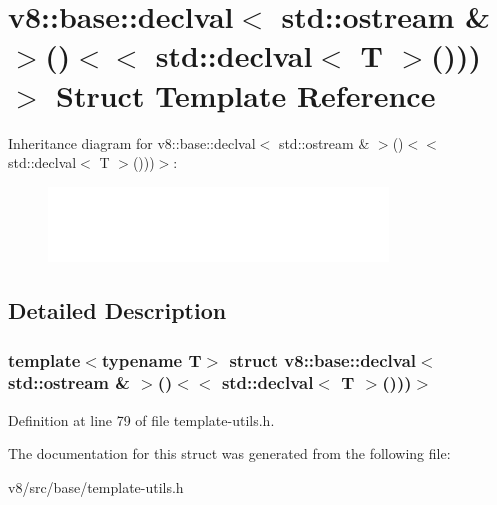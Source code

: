 \hypertarget{structv8_1_1base_1_1has__output__operator_3_01T_00_01decltype_07void_07std_1_1declval_3_01std_1_e71c171d5446bd2be4ce9ee2faa3c0bc}{}\section{v8\+:\+:base\+:\+:declval$<$ std\+:\+:ostream \& $>$()$<$$<$ std\+:\+:declval$<$ T $>$()))$>$ Struct Template Reference}
\label{structv8_1_1base_1_1has__output__operator_3_01T_00_01decltype_07void_07std_1_1declval_3_01std_1_e71c171d5446bd2be4ce9ee2faa3c0bc}
Inheritance diagram for v8\+:\+:base\+:\+:declval$<$ std\+:\+:ostream \& $>$()$<$$<$ std\+:\+:declval$<$ T $>$()))$>$\+:\begin{figure}[H]
\begin{center}
\leavevmode
\includegraphics[height=2.000000cm]{structv8_1_1base_1_1has__output__operator_3_01T_00_01decltype_07void_07std_1_1declval_3_01std_1_e71c171d5446bd2be4ce9ee2faa3c0bc}
\end{center}
\end{figure}


\subsection{Detailed Description}
\subsubsection*{template$<$typename T$>$\newline
struct v8\+::base\+::declval$<$ std\+::ostream \& $>$()$<$$<$ std\+::declval$<$ T $>$()))$>$}



Definition at line 79 of file template-\/utils.\+h.



The documentation for this struct was generated from the following file\+:\begin{DoxyCompactItemize}
\item 
v8/src/base/template-\/utils.\+h\end{DoxyCompactItemize}

